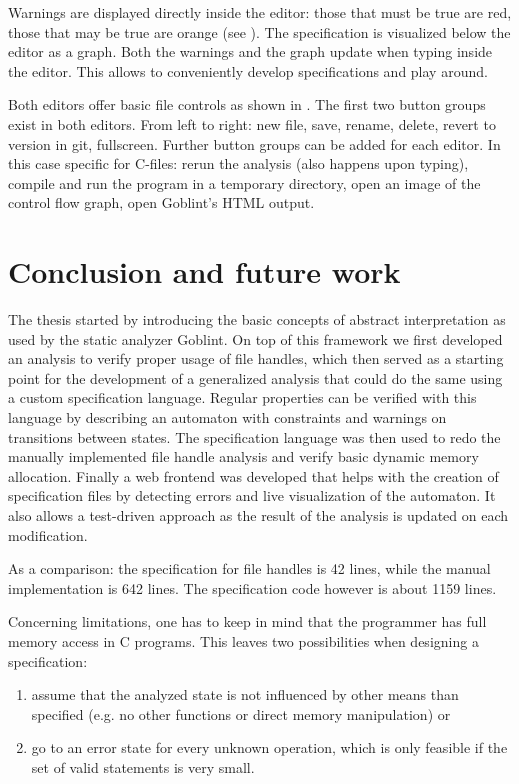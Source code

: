 Warnings are displayed directly inside the editor: those that must be true are red, those that may be true are orange (see ).
The specification is visualized below the editor as a graph.
Both the warnings and the graph update when typing inside the editor. This allows to conveniently develop specifications and play around.

Both editors offer basic file controls as shown in . The first two button groups exist in both editors. From left to right: new file, save, rename, delete, revert to version in git, fullscreen. Further button groups can be added for each editor. In this case specific for C-files: rerun the analysis (also happens upon typing), compile and run the program in a temporary directory, open an image of the control flow graph, open Goblint's HTML output.


\chapter{Conclusion and future work}
The thesis started by introducing the basic concepts of abstract interpretation as used by the static analyzer Goblint. On top of this framework we first developed an analysis to verify proper usage of file handles, which then served as a starting point for the development of a generalized analysis that could do the same using a custom specification language. Regular properties can be verified with this language by describing an automaton with constraints and warnings on transitions between states.
The specification language was then used to redo the manually implemented file handle analysis and verify basic dynamic memory allocation. Finally a web frontend was developed that helps with the creation of specification files by detecting errors and live visualization of the automaton. It also allows a test-driven approach as the result of the analysis is updated on each modification.

As a comparison: the specification for file handles is 42 lines, while the manual implementation is 642 lines. The specification code however is about 1159 lines. %

Concerning limitations, one has to keep in mind that the programmer has full memory access in C programs. This leaves two possibilities when designing a specification:
\begin{enumerate}
\item assume that the analyzed state is not influenced by other means than specified (e.g. no other functions or direct memory manipulation) or
\item go to an error state for every unknown operation, which is only feasible if the set of valid statements is very small.
\end{enumerate}

